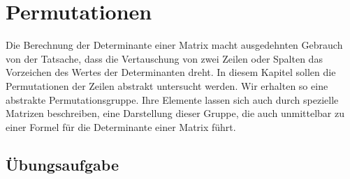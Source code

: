 %
%
%
\chapter{Permutationen
\label{buch:chapter:permutationen}}
\rhead{}
Die Berechnung der Determinante einer Matrix macht ausgedehnten
%
Gebrauch von der Tatsache, dass die Vertauschung von zwei Zeilen
oder Spalten das Vorzeichen des Wertes der Determinanten dreht.
In diesem Kapitel sollen die Permutationen der Zeilen abstrakt
%
untersucht werden.
Wir erhalten so eine abstrakte Permutationsgruppe.
%
Ihre Elemente lassen sich auch durch spezielle Matrizen beschreiben,
eine Darstellung dieser Gruppe, die auch unmittelbar zu einer
%
Formel für die Determinante einer Matrix führt.






\section*{Übungsaufgabe}
\begin{uebungsaufgaben}
\end{uebungsaufgaben}

